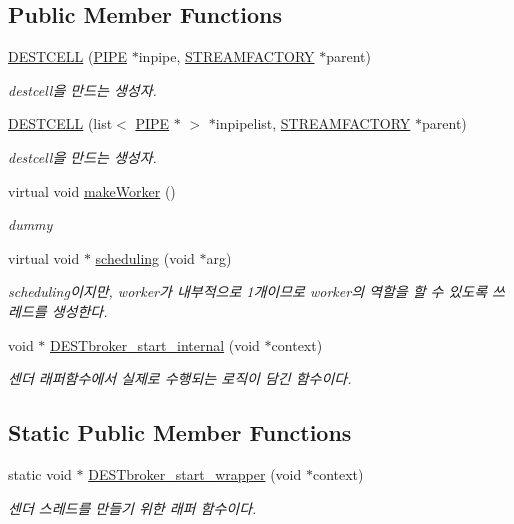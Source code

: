 \subsection*{Public Member Functions}
\begin{DoxyCompactItemize}
\item 
\hyperlink{classDESTCELL_ac00a818070523ebc47f8ed37a5f5e052}{D\+E\+S\+T\+C\+E\+L\+L} (\hyperlink{classPIPE}{P\+I\+P\+E} $\ast$inpipe, \hyperlink{classSTREAMFACTORY}{S\+T\+R\+E\+A\+M\+F\+A\+C\+T\+O\+R\+Y} $\ast$parent)
\begin{DoxyCompactList}\small\item\em destcell을 만드는 생성자. \end{DoxyCompactList}\item 
\hyperlink{classDESTCELL_a17a692f1fdb71d88276696a6935032dd}{D\+E\+S\+T\+C\+E\+L\+L} (list$<$ \hyperlink{classPIPE}{P\+I\+P\+E} $\ast$ $>$ $\ast$inpipelist, \hyperlink{classSTREAMFACTORY}{S\+T\+R\+E\+A\+M\+F\+A\+C\+T\+O\+R\+Y} $\ast$parent)
\begin{DoxyCompactList}\small\item\em destcell을 만드는 생성자. \end{DoxyCompactList}\item 
virtual void \hyperlink{classDESTCELL_a98ba282e719612c8dbeaca6037968a6b}{make\+Worker} ()
\begin{DoxyCompactList}\small\item\em dummy \end{DoxyCompactList}\item 
virtual void $\ast$ \hyperlink{classDESTCELL_a19366e1b07246beeff944f5c0c3ca520}{scheduling} (void $\ast$arg)
\begin{DoxyCompactList}\small\item\em scheduling이지만, worker가 내부적으로 1개이므로 worker의 역할을 할 수 있도록 쓰레드를 생성한다. \end{DoxyCompactList}\item 
void $\ast$ \hyperlink{classDESTCELL_aa0a87ac0f210e28a81eda557b86b16d3}{D\+E\+S\+Tbroker\+\_\+start\+\_\+internal} (void $\ast$context)
\begin{DoxyCompactList}\small\item\em 센더 래퍼함수에서 실제로 수행되는 로직이 담긴 함수이다. \end{DoxyCompactList}\end{DoxyCompactItemize}
\subsection*{Static Public Member Functions}
\begin{DoxyCompactItemize}
\item 
static void $\ast$ \hyperlink{classDESTCELL_a478210dc9fb7c6fc1da37a153772464d}{D\+E\+S\+Tbroker\+\_\+start\+\_\+wrapper} (void $\ast$context)
\begin{DoxyCompactList}\small\item\em 센더 스레드를 만들기 위한 래퍼 함수이다. \end{DoxyCompactList}\end{DoxyCompactItemize}
